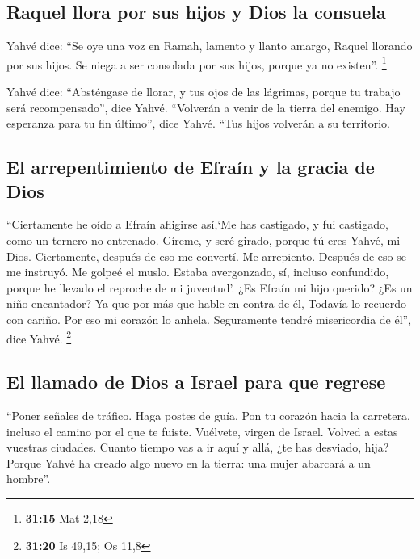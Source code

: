 \begin{paracol}{2}
\hypertarget{raquel-llora-por-sus-hijos-y-dios-la-consuela}{%
\subsection{Raquel llora por sus hijos y Dios la
consuela}\label{raquel-llora-por-sus-hijos-y-dios-la-consuela}}

 Yahvé dice: ``Se oye una voz en Ramah, lamento y llanto
amargo, Raquel llorando por sus hijos. Se niega a ser consolada por sus
hijos, porque ya no existen''. \footnote{\textbf{31:15} Mat 2,18}

 Yahvé dice: ``Absténgase de llorar, y tus ojos de las
lágrimas, porque tu trabajo será recompensado'', dice Yahvé. ``Volverán
a venir de la tierra del enemigo.  Hay esperanza para tu
fin último'', dice Yahvé. ``Tus hijos volverán a su territorio.

\hypertarget{el-arrepentimiento-de-efrauxedn-y-la-gracia-de-dios}{%
\subsection{El arrepentimiento de Efraín y la gracia de
Dios}\label{el-arrepentimiento-de-efrauxedn-y-la-gracia-de-dios}}

 ``Ciertamente he oído a Efraín afligirse así,`Me has
castigado, y fui castigado, como un ternero no entrenado. Gíreme, y seré
girado, porque tú eres Yahvé, mi Dios.  Ciertamente,
después de eso me convertí. Me arrepiento. Después de eso se me
instruyó. Me golpeé el muslo. Estaba avergonzado, sí, incluso
confundido, porque he llevado el reproche de mi juventud'.
 ¿Es Efraín mi hijo querido? ¿Es un niño encantador? Ya
que por más que hable en contra de él, Todavía lo recuerdo con cariño.
Por eso mi corazón lo anhela. Seguramente tendré misericordia de él'',
dice Yahvé. \footnote{\textbf{31:20} Is 49,15; Os 11,8}

\hypertarget{el-llamado-de-dios-a-israel-para-que-regrese}{%
\subsection{El llamado de Dios a Israel para que
regrese}\label{el-llamado-de-dios-a-israel-para-que-regrese}}

 ``Poner señales de tráfico. Haga postes de guía. Pon tu
corazón hacia la carretera, incluso el camino por el que te fuiste.
Vuélvete, virgen de Israel. Volved a estas vuestras ciudades.
 Cuanto tiempo vas a ir aquí y allá, ¿te has desviado,
hija? Porque Yahvé ha creado algo nuevo en la tierra: una mujer abarcará
a un hombre''.


\end{paracol}
